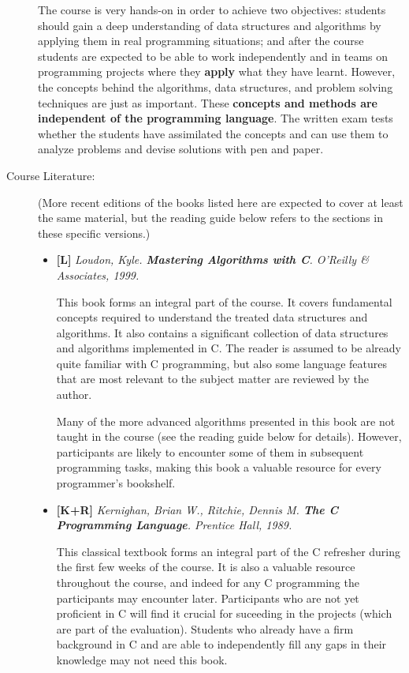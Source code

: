 \documentclass[a4paper]{article}
\newcommand{\refl}{\textbf{[L]}\xspace}
\newcommand{\refkr}{\textbf{[K+R]}\xspace}
\begin{document}
\begin{description}
  The course is very hands-on in order to achieve two objectives:
  students should gain a deep understanding of data structures and algorithms by applying them in real programming situations;
  and after the course students are expected to be able to work independently and in teams on programming projects where they \textbf{apply} what they have learnt.
  However, the concepts behind the algorithms, data structures, and problem solving techniques are just as important.
  These \textbf{concepts and methods are independent of the programming language}.
  The written exam tests whether the students have assimilated the concepts and can use them to analyze problems and devise solutions with pen and paper.
  
\item[Course Literature:]
  (More recent editions of the books listed here are expected to cover at least the same material, but the reading guide below refers to the sections in these specific versions.)
  
  \begin{itemize}
    
  \item \refl
    \emph{
      Loudon, Kyle. \textbf{Mastering Algorithms with C}. O'Reilly \& Associates, 1999.
    }
    
  This book forms an integral part of the course.
  It covers fundamental concepts required to understand the treated data structures and algorithms.
  It also contains a significant collection of data structures and algorithms implemented in C.
  The reader is assumed to be already quite familiar with C programming, but also some language features that are most relevant to the subject matter are reviewed by the author.
  
  Many of the more advanced algorithms presented in this book are not taught in the course (see the reading guide below for details).
  However, participants are likely to encounter some of them in subsequent programming tasks, making this book a valuable resource for every programmer's bookshelf.
  
  \item \refkr
    \emph{
      Kernighan, Brian W., Ritchie, Dennis M. \textbf{The C Programming Language}. Prentice Hall, 1989.
    }
    
    This classical textbook forms an integral part of the C refresher during the first few weeks of the course.
    It is also a valuable resource throughout the course, and indeed for any C programming the participants may encounter later.
    Participants who are not yet proficient in C will find it crucial for suceeding in the projects (which are part of the evaluation).
    Students who already have a firm background in C and are able to independently fill any gaps in their knowledge may not need this book.
    
  \end{itemize}
  
\end{description}
\end{document}
